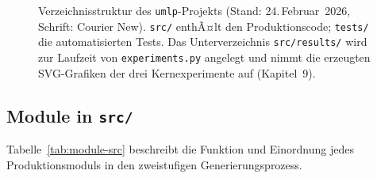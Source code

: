 ﻿\documentclass[a4paper,12pt]{report}
\theoremstyle{definition}
\begin{document}
\begin{figure}[H]
{\begin{minipage}{0.86\textwidth}
		\end{minipage}%
	}
	\caption{Verzeichnisstruktur des \texttt{umlp}-Projekts
		(Stand: 24.\,Februar~2026, Schrift: Courier New).
		\texttt{src/} enthÃ¤lt den Produktionscode;
		\texttt{tests/} die automatisierten Tests.
		Das Unterverzeichnis \texttt{src/results/} wird
		zur Laufzeit von \texttt{experiments.py} angelegt
		und nimmt die erzeugten SVG-Grafiken der drei
		Kernexperimente auf (Kapitel~9).}
	\label{fig:projektstruktur}
\end{figure}


\subsection{Module in \texttt{src/}}
\label{subsubsec:module-src}

Tabelle~\ref{tab:module-src} beschreibt die Funktion und
Einordnung jedes Produktionsmoduls in den zweistufigen
Generierungsprozess.
\end{document}
